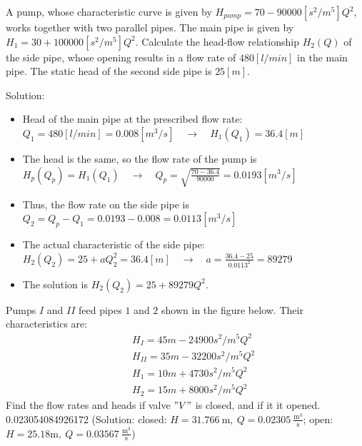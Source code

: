 
\vspace{1cm}

A pump, whose characteristic curve is given by $H_{pump}=70-90000[s^2/m^5]Q^2$, works together with two parallel pipes. The main pipe is given by $H_1=30+100000[s^2/m^5]Q^2$. Calculate the head-flow relationship $H_2(Q)$ of the side pipe, whose opening results in a flow rate of $480[l/min]$ in the main pipe. The static head of the second side pipe is $25[m]$.

\noindent Solution: 

\begin{itemize}
\item Head of the main pipe at the prescribed flow rate: $Q_1 = 480[l/min]=0.008[m^3/s] \quad \rightarrow \quad H_1(Q_1)=36.4[m]$
%
\item The head is the same, so the flow rate of the pump is
 $H_p(Q_p)= H_1(Q_1) \quad \rightarrow \quad Q_p=\sqrt{\frac{70-36.4}{90000}}=0.0193[m^3/s]$
%
\item Thus, the flow rate on the side pipe is $Q_2=Q_p-Q_1=0.0193-0.008=0.0113[m^3/s]$
%
\item The actual characteristic of the side pipe: $H_2(Q_2)=25+aQ_2^2=36.4[m] \quad \rightarrow \quad a=\frac{36.4-25}{0.0113^2}=89279$
%
\item The solution is $H_2(Q_2)=25+89279 Q^2$.
\end{itemize}


\vspace{1cm}

Pumps $I$ and $II$ feed pipes $1$ and $2$ shown in the figure below. Their characteristics are:
\begin{eqnarray}
	&& H_I = 45m-24900s^2/m^5Q^2 \nonumber \\
	&& H_{II} = 35m-32200s^2/m^5Q^2 \nonumber \\
	&& H_1 = 10m+4730s^2/m^5Q^2 \nonumber \\
	&& H_2 = 15m+8000s^2/m^5Q^2\nonumber
\end{eqnarray}
Find the flow rates and heads if valve $"V"$ is closed, and if it it opened. 
0.023054084926172
(Solution: closed: $H=31.766~\mathrm{m},~Q=0.02305~\frac{\mathrm{m^3}}{\mathrm{s}}$; open:  $H=25.18\mathrm{m},~Q=0.03567~\frac{\mathrm{m^3}}{\mathrm{s}}$)

